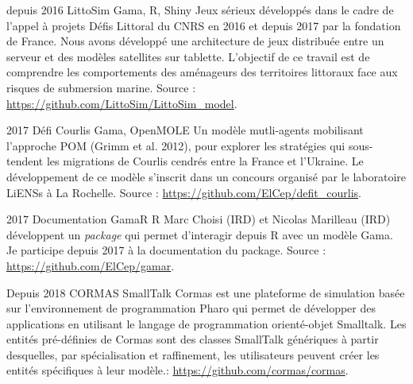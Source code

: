 \documentclass[]{cv-etienne}
\begin{document}
\begin{entrylist}
\entry
{depuis 2016}
{LittoSim}
{Gama, R, Shiny}
{
Jeux sérieux développés dans le cadre de l'appel à projets Défis Littoral du CNRS en 2016 et depuis 2017 par la fondation de France. Nous avons développé une architecture de jeux distribuée entre un serveur et des modèles satellites sur tablette. L'objectif de ce travail est de comprendre les comportements des aménageurs des territoires littoraux face aux risques de submersion marine. Source : \url{https://github.com/LittoSim/LittoSim_model}.
}
\end{entrylist}
\begin{entrylist}
\entry
{2017}
{Défi Courlis}
{Gama, OpenMOLE}
{
Un modèle mutli-agents mobilisant l'approche POM (Grimm et al. 2012), pour explorer les stratégies qui sous-tendent les migrations de Courlis cendrés entre la France et l'Ukraine. Le développement de ce modèle s'inscrit dans un concours organisé par le laboratoire LiENSs à La Rochelle. Source : \url{https://github.com/ElCep/defit_courlis}.
}
\end{entrylist}
\begin{entrylist}
\entry
{2017}
{Documentation GamaR}
{R}
{
Marc Choisi (IRD) et Nicolas Marilleau (IRD) développent un \textit{package} qui permet d'interagir depuis R avec un modèle Gama. Je participe depuis 2017 à la documentation du package. Source : \url{https://github.com/ElCep/gamar}.
}
\end{entrylist}
\begin{entrylist}
\entry
{Depuis 2018}
{CORMAS}
{SmallTalk}
{
 Cormas est une plateforme de simulation basée sur l'environnement de programmation Pharo qui permet de développer des applications en utilisant le langage de programmation orienté-objet Smalltalk. Les entités pré-définies de Cormas sont des classes SmallTalk génériques à partir desquelles, par spécialisation et raffinement, les utilisateurs peuvent créer les entités spécifiques à leur modèle.: \url{https://github.com/cormas/cormas}.
}
\end{entrylist}
\end{document}
